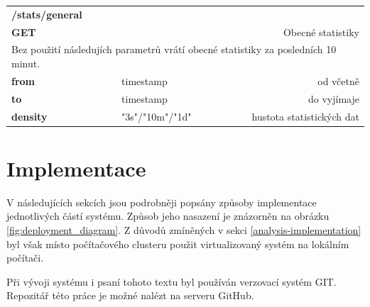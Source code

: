 \documentclass[thesis=B,czech]{FITthesis}[2012/06/26]
\begin{document}
\begin{table}[h]
\begin{tabular}{llllr}
\rowcolor[HTML]{EFEFEF}
\large \textbf{/stats/general}        &         &                 &        & \multicolumn{1}{l}{}                \\
\rowcolor[HTML]{EFEFEF}
\textbf{GET}          &         &                 &        & Obecné statistiky                        \\
\multicolumn{5}{l}{\parbox[t]{12.8cm}{Bez použití následujích parametrů vrátí obecné statistiky za posledních 10 minut.  }  } \\
\textbf{from}         &         & timestamp       &        & od včetně                           \\
\textbf{to}           &         & timestamp       &        & do vyjímaje                         \\
\textbf{density}        &         & "3s"/"10m"/"1d"         &        & hustota statistických dat   \\
\end{tabular}
\end{table}


\chapter{Implementace}
V následujících sekcích jsou podrobněji popsány způsoby implementace jednotlivých částí systému. Způsob jeho nasazení je znázorněn na obrázku \ref{fig:deployment_diagram}. Z důvodů zmíněných v sekci \ref{analysis-implementation} byl však místo počítačového clusteru použit virtualizovaný systém na lokálním počítači. 

Při vývoji systému i psaní tohoto textu byl používán verzovací systém GIT. Repozitář této práce je možné nalézt na serveru GitHub\cite{ghrtyrtt}. 
\end{document}
